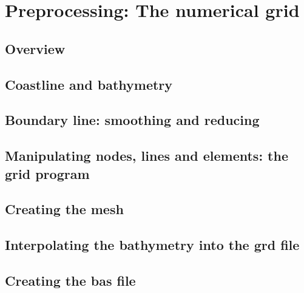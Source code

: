 \documentclass{report}
\begin{document}

\chapter{Preprocessing: The numerical grid}

	\section{Overview}
	

	\section{Coastline and bathymetry}
	

	\section{Boundary line: smoothing and reducing}
	

%	

	\section{Manipulating nodes, lines and elements: the grid program}
	

	\section{Creating the mesh}
	

	\section{Interpolating the bathymetry into the grd file}
	

	\section{Creating the bas file}
	
\end{document}
